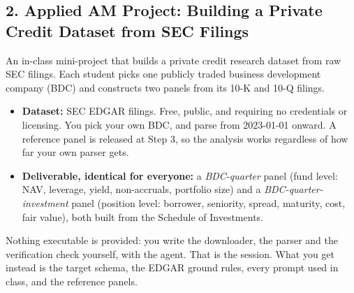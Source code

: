 \documentclass[11pt]{article}
\begin{document}
\subsection*{2. Applied AM Project: Building a Private Credit Dataset from SEC Filings}
An in-class mini-project that builds a private credit research dataset from raw SEC filings. Each student picks one publicly traded business development company (BDC) and constructs two panels from its 10-K and 10-Q filings.
\begin{itemize}
  \item \textbf{Dataset:} SEC EDGAR filings. Free, public, and requiring no credentials or licensing. You pick your own BDC, and parse from 2023-01-01 onward. A reference panel is released at Step 3, so the analysis works regardless of how far your own parser gets.
  \item \textbf{Deliverable, identical for everyone:} a \emph{BDC-quarter} panel (fund level: NAV, leverage, yield, non-accruals, portfolio size) and a \emph{BDC-quarter-investment} panel (position level: borrower, seniority, spread, maturity, cost, fair value), both built from the Schedule of Investments.
\end{itemize}
Nothing executable is provided: you write the downloader, the parser and the verification check yourself, with the agent. That is the session. What you get instead is the target schema, the EDGAR ground rules, every prompt used in class, and the reference panels.
\end{document}

